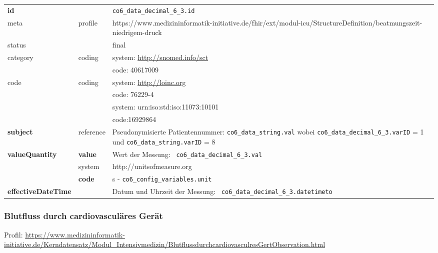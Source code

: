 \begin{longtable}{|l|l|p{7.5cm}|}
	\hline
	\rowcolor{lightgray} \multicolumn{3}{|l|}{Data Mapping (inhaltlich)} \\ \hline
	\textbf{id} &  & \texttt{co6\_data\_decimal\_6\_3.id} \\ \hline
	meta & profile & https://www.medizininformatik-initiative.de/fhir/ext/modul-icu/StructureDefinition/beatmungszeit-niedrigem-druck \\ \hline 
	status &  & final   \\ \hline 
	category & coding & system: \url{http://snomed.info/sct} \\
	\cline{3-3}
	& & code: 40617009 \\ \hline
	code & coding & system: \url{http://loinc.org} \\ 
	\cline{3-3} 
	&  & code: 76229-4 \\ 
	\cline{3-3} 
	&  & system: urn:iso:std:iso:11073:10101 \\ 
	\cline{3-3} 
	&  & code:16929864  \\ \hline
	\textbf{subject} & reference & Pseudonymisierte Patientennummer: \texttt{co6\_data\_string.val} wobei \texttt{co6\_data\_decimal\_6\_3.varID} = 1 und \texttt{co6\_data\_string.varID} = 8 \\ \hline
	\textbf{valueQuantity}  & \textbf{value} & Wert der Messung: \texttt{
		co6\_data\_decimal\_6\_3.val} \\
	\cline{2-3}
	& system & http://unitsofmeasure.org \\
	\cline{2-3}
	& \textbf{code} & s - \texttt{co6\_config\_variables.unit}
	\\ \hline
	\textbf{effectiveDateTime}  & & Datum und Uhrzeit der Messung: \texttt{
		co6\_data\_decimal\_6\_3.datetimeto} \\
	\hline
\end{longtable}


\subsubsection{Blutfluss durch cardiovasculäres Gerät} 

Profil: \url{https://www.medizininformatik-initiative.de/Kerndatensatz/Modul_Intensivmedizin/BlutflussdurchcardiovasculresGertObservation.html}


